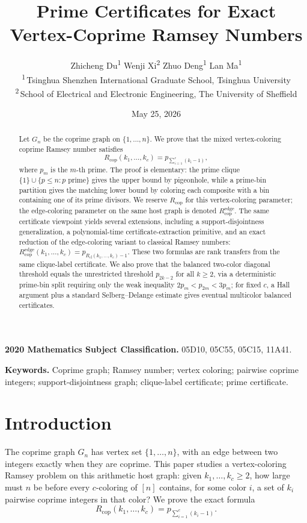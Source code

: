 \documentclass[11pt]{article}
\title{Prime Certificates for Exact Vertex-Coprime Ramsey Numbers}
\author{Zhicheng Du\textsuperscript{1} \quad
Wenji Xi\textsuperscript{2} \quad
Zhuo Deng\textsuperscript{1} \quad
Lan Ma\textsuperscript{1}\\[0.5em]
\small \textsuperscript{1}\,Tsinghua Shenzhen International Graduate School,
Tsinghua University\\
\small \textsuperscript{2}\,School of Electrical and Electronic Engineering,
The University of Sheffield}
\date{May 25, 2026}
\theoremstyle{plain}
\theoremstyle{definition}
\theoremstyle{remark}
\newcommand{\Rcop}{R_{\mathrm{cop}}}
\newcommand{\Redge}{R_{\mathrm{cop}}^{\mathrm{edge}}}
\newcommand{\Rcl}{R_{\mathrm{cl}}}
\begin{document}
\maketitle

\begin{abstract}
Let $G_n$ be the coprime graph on $\{1,\ldots,n\}$.  We prove that the mixed
vertex-coloring coprime Ramsey number satisfies
\[
  \Rcop(k_1,\ldots,k_c)=p_{\sum_{i=1}^c(k_i-1)},
\]
where $p_m$ is the $m$-th prime.  The proof is elementary: the prime clique
$\{1\}\cup\{p\le n:p\text{ prime}\}$ gives the upper bound by pigeonhole,
while a prime-bin partition gives the matching lower bound by coloring each
composite with a bin containing one of its prime divisors.  We reserve
$\Rcop$ for this vertex-coloring parameter; the edge-coloring parameter on
the same host graph is denoted $\Redge$.  The same certificate viewpoint
yields several extensions, including a support-disjointness generalization, a
polynomial-time certificate-extraction primitive, and an exact reduction of
the edge-coloring variant to classical Ramsey numbers:
$\Redge(k_1,\ldots,k_c)=p_{\Rcl(k_1,\ldots,k_c)-1}$.  These two formulas are
rank transfers from the same clique-label certificate.  We also prove that
the balanced two-color diagonal threshold equals the unrestricted threshold
$p_{2k-2}$ for all $k\ge2$, via a deterministic prime-bin split requiring
only the weak inequality $2p_m<p_{2m}<3p_m$; for fixed $c$, a Hall argument
plus a standard Selberg--Delange estimate gives eventual multicolor balanced
certificates.
\end{abstract}

\noindent\textbf{2020 Mathematics Subject Classification.}
05D10, 05C55, 05C15, 11A41.

\medskip
\noindent\textbf{Keywords.}
Coprime graph; Ramsey number; vertex coloring; pairwise coprime integers;
support-disjointness graph; clique-label certificate; prime certificate.

\section{Introduction}

The coprime graph $G_n$ has vertex set $\{1,\ldots,n\}$, with an edge between
two integers exactly when they are coprime.  This paper studies a
vertex-coloring Ramsey problem on this arithmetic host graph: given
$k_1,\ldots,k_c\ge2$, how large must $n$ be before every $c$-coloring of
$[n]$ contains, for some color $i$, a set of $k_i$ pairwise coprime integers
in that color?  We prove the exact formula
\[
  \Rcop(k_1,\ldots,k_c)=p_{\sum_{i=1}^c(k_i-1)}.
\]
\end{document}
